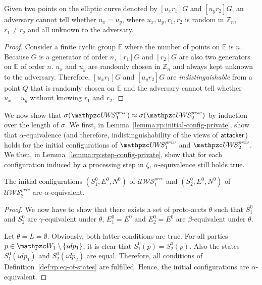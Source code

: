 \begin{theorem}
  \begin{lemma}\label{thm-rp-unlinkability}
    Given two points on the elliptic curve denoted by $[u_xr_1]G$ and $[u_yr_2]G$, 
    an adversary cannot tell whether $u_x=u_y$, where $u_x, u_y, r_1, r_2$ is random in $\mathbb{Z}_n$, $r_1\neq r_2$ and all unknown to the adversary.
  \end{lemma}
  \begin{proof}
    Consider a finite cyclic group $\mathbb{E}$ where the number of points on $\mathbb{E}$ is $n$. 
    Because $G$ is a generator of order $n$, $[r_1]G$ and $[r_2]G$ are also two generators on $\mathbb{E}$ of order $n$. 
    $u_x$ and $u_y$ are randomly chosen in $\mathbb{Z}_n$ and always kept unknown to the adversary. 
    Therefore, $[u_xr_1]G$ and $[u_yr_2]G$ are \emph{indistinguishable} from a point $Q$ that is randomly chosen on $\mathbb{E}$ \cite{oprf-proved,voprf-proved} 
    and the adversary cannot tell whether $u_x=u_y$ without knowing $r_1$ and $r_2$.
  \end{proof}
  
  We now show that $\sigma(\uppressoprivwebsystem_1) \approx
  \sigma(\uppressoprivwebsystem_2)$ by induction over the length 
  of $\sigma$. 
  We first, in Lemma~\ref{lemma:rp:initial-config-private}, 
  show that $\alpha$-equivalence (and therefore, 
  indistinguishability of the views of $\mathsf{attacker}$) holds 
  for the initial configurations of $\uppressoprivwebsystem_1$ 
  and $\uppressoprivwebsystem_2$. 
  We then, in Lemma~\ref{lemma:rp:step-config-private}, 
  show that for each configuration induced by a processing step 
  in $\zeta$, $\alpha$-equivalence still holds true.
  
  \begin{lemma}\label{lemma:rp:initial-config-private}
    The initial configurations $(S_1^0,E^0,N^0)$ of 
    $\mathcal{U\!W\!S}^{priv}_1$ and $(S_2^0,E^0,N^0)$ of 
    $\mathcal{U\!W\!S}^{priv}_2$ are $\alpha$-equivalent.
  \end{lemma}
  \begin{proof}
    We now have to show that there exists a set of proto-accts 
    $\theta$ such that $S_1^0$ and $S_2^0$ are 
    $\gamma$-equivalent under $\theta$, $E_1^0 = E^0$ and 
    $E_2^0 = E^0$ are $\beta$-equivalent under $\theta$.
  
    Let $\theta=L=\emptyset$. Obviously, both latter conditions 
    are true. For all parties $p \in \bidsystem_1 \setminus \{idp_1\}$, 
    it is clear that $S_1^0(p) = S_2^0(p)$. Also the states 
    $S_1^0(idp_1)$ and $S_2^0(idp_2)$ are equal. Therefore, 
    all conditions of Definition~\ref{def:rp:eq-of-states} are 
    fulfilled. Hence, the initial configurations are 
    $\alpha$-equivalent.
  \end{proof}
  

\end{theorem}
